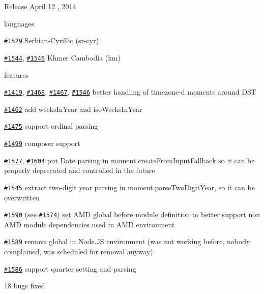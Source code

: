 \begin{DoxyItemize}
\item Release April 12 , 2014
\item languages
\begin{DoxyItemize}
\item \href{https://github.com/moment/moment/issues/1529}{\tt \#1529} Serbian-\/\+Cyrillic (sr-\/cyr)
\item \href{https://github.com/moment/moment/issues/1544}{\tt \#1544}, \href{https://github.com/moment/moment/issues/1546}{\tt \#1546} Khmer Cambodia (km)
\end{DoxyItemize}
\item features
\begin{DoxyItemize}
\item \href{https://github.com/moment/moment/issues/1419}{\tt \#1419}, \href{https://github.com/moment/moment/issues/1468}{\tt \#1468}, \href{https://github.com/moment/moment/issues/1467}{\tt \#1467}, \href{https://github.com/moment/moment/issues/1546}{\tt \#1546} better handling of timezone-\/d moments around D\+ST
\item \href{https://github.com/moment/moment/issues/1462}{\tt \#1462} add weeks\+In\+Year and iso\+Weeks\+In\+Year
\item \href{https://github.com/moment/moment/issues/1475}{\tt \#1475} support ordinal parsing
\item \href{https://github.com/moment/moment/issues/1499}{\tt \#1499} composer support
\item \href{https://github.com/moment/moment/issues/1577}{\tt \#1577}, \href{https://github.com/moment/moment/issues/1604}{\tt \#1604} put Date parsing in moment.\+create\+From\+Input\+Fallback so it can be properly deprecated and controlled in the future
\item \href{https://github.com/moment/moment/issues/1545}{\tt \#1545} extract two-\/digit year parsing in moment.\+parse\+Two\+Digit\+Year, so it can be overwritten
\item \href{https://github.com/moment/moment/issues/1590}{\tt \#1590} (see \href{https://github.com/moment/moment/issues/1574}{\tt \#1574}) set A\+MD global before module definition to better support non A\+MD module dependencies used in A\+MD environment
\item \href{https://github.com/moment/moment/issues/1589}{\tt \#1589} remove global in Node.\+JS environment (was not working before, nobody complained, was scheduled for removal anyway)
\item \href{https://github.com/moment/moment/issues/1586}{\tt \#1586} support quarter setting and parsing
\end{DoxyItemize}
\item 18 bugs fixed
\end{DoxyItemize}

